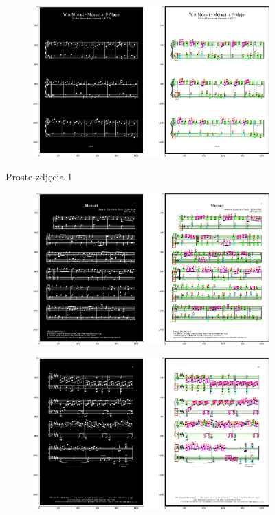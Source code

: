 \documentclass[12pt]{article}
\begin{document}
\begin{enumerate}
\begin{figure}[h!]
\begin{subfigure}[b]{0.48\linewidth}
					\includegraphics[width=\linewidth]{Eazy/Zdj9.png}
				\end{subfigure}
				\label{fig:nuuty2}
				\caption{Proste zdjęcia 1}
			\end{figure}
			\begin{figure}[h!]
				\centering
				\begin{subfigure}[b]{0.48\linewidth}
					\includegraphics[width=\linewidth]{Eazy/Zdj10.png}
				\end{subfigure}
				\begin{subfigure}[b]{0.48\linewidth}
					\includegraphics[width=\linewidth]{Eazy/Zdj11.png}

\end{subfigure}
\end{figure}
\end{enumerate}
\end{document}

